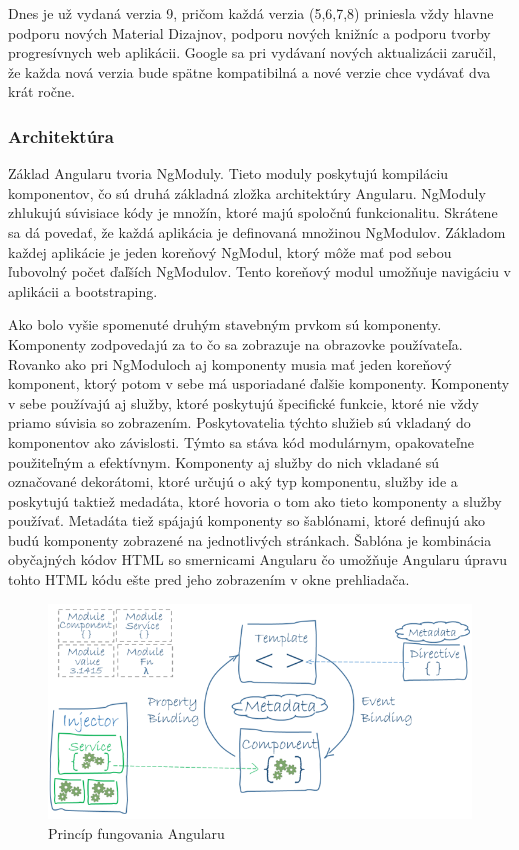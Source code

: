 \indent Dnes je už vydaná verzia 9, pričom každá verzia (5,6,7,8) priniesla vždy hlavne podporu nových Material Dizajnov, podporu nových knižníc a podporu tvorby progresívnych web aplikácii. Google sa pri vydávaní nových aktualizácii zaručil, že každa nová verzia bude spätne kompatibilná a nové verzie chce vydávať dva krát ročne.

\subsubsection{Architektúra}
\indent Základ Angularu tvoria NgModuly. Tieto moduly poskytujú kompiláciu komponentov, čo sú druhá základná zložka architektúry Angularu. NgModuly zhlukujú súvisiace kódy je množín, ktoré majú spoločnú funkcionalitu. Skrátene sa dá povedať, že každá aplikácia je definovaná množinou NgModulov. Základom každej aplikácie je jeden koreňový NgModul, ktorý môže mať pod sebou ľubovolný počet ďaľších NgModulov. Tento koreňový modul umožňuje navigáciu v aplikácii a bootstraping. 

\indent Ako bolo vyšie spomenuté druhým stavebným prvkom sú komponenty. Komponenty zodpovedajú za to čo sa zobrazuje na obrazovke používateľa. Rovanko ako pri NgModuloch aj komponenty musia mať jeden koreňový komponent, ktorý potom v sebe má usporiadané ďalšie komponenty. Komponenty v sebe používajú aj služby, ktoré poskytujú špecifické funkcie, ktoré nie vždy priamo súvisia so zobrazením. Poskytovatelia týchto služieb sú vkladaný do komponentov ako závislosti. Týmto sa stáva kód modulárnym, opakovateľne použiteľným a efektívnym. Komponenty aj služby do nich vkladané sú označované dekorátomi, ktoré určujú o aký typ komponentu, služby ide a poskytujú taktiež medadáta, ktoré hovoria o tom ako tieto komponenty a služby používať. Metadáta tiež spájajú komponenty so šablónami, ktoré definujú ako budú komponenty zobrazené na jednotlivých stránkach. Šablóna je kombinácia obyčajných kódov HTML so smernicami Angularu čo umožňuje Angularu úpravu tohto HTML kódu ešte pred jeho zobrazením v okne prehliadača. 

\begin{figure}[H]
    \centering
    \includegraphics[scale=0.5]{img/angular_architecture.png}
    \caption{Princíp fungovania Angularu}
    \label{fig:angular_architecture}
\end{figure}

